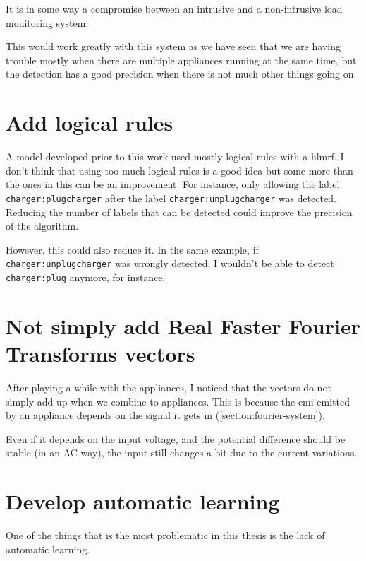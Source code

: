It is in some way a compromise between an intrusive and a non-intrusive load monitoring system.

This would work greatly with this system as we have seen that we are having trouble mostly when there are multiple appliances running at the same time, but the detection has a good precision when there is not much other things going on.

\section{Add logical rules}
A model developed prior to this work used mostly logical rules with a \acrshort{hlmrf}. I don't think that using too much logical rules is a good idea but some more than the ones in this can be an improvement. For instance, only allowing the label \texttt{charger:plugcharger} after the label \texttt{charger:unplugcharger} was detected. Reducing the number of labels that can be detected could improve the precision of the algorithm.

However, this could also reduce it. In the same example, if \texttt{charger:unplugcharger} was wrongly detected, I wouldn't be able to detect \texttt{charger:plug} anymore, for instance. 

\section{Not simply add Real Faster Fourier Transforms vectors}
After playing a while with the appliances, I noticed that the vectors do not simply add up when we combine to appliances. This is because the \acrshort{emi} emitted by an appliance depends on the signal it gets in (\autoref{section:fourier-system}).

Even if it depends on the input voltage, and the potential difference should be stable (in an AC way), the input still changes a bit due to the current variations.

\section{Develop automatic learning}
One of the things that is the most problematic in this thesis is the lack of automatic learning.

